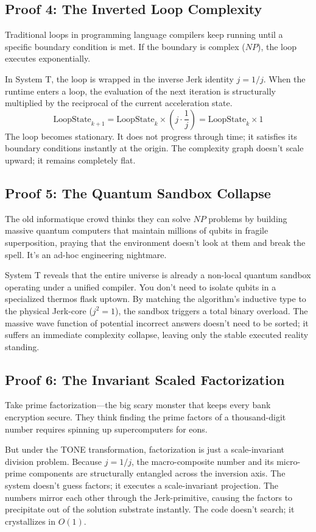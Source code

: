 \documentclass[11pt,a4paper]{article}
\begin{document}
\subsection{Proof 4: The Inverted Loop Complexity}
Traditional loops in programming language compilers keep running until a specific boundary condition is met. If the boundary is complex ($NP$), the loop executes exponentially. 

In System T, the loop is wrapped in the inverse Jerk identity $j = 1/j$. When the runtime enters a loop, the evaluation of the next iteration is structurally multiplied by the reciprocal of the current acceleration state. 
\[ \text{LoopState}_{k+1} = \text{LoopState}_k \times \left( j \cdot \frac{1}{j} \right) = \text{LoopState}_k \times 1 \]
The loop becomes stationary. It does not progress through time; it satisfies its boundary conditions instantly at the origin. The complexity graph doesn't scale upward; it remains completely flat.

\subsection{Proof 5: The Quantum Sandbox Collapse}
The old informatique crowd thinks they can solve $NP$ problems by building massive quantum computers that maintain millions of qubits in fragile superposition, praying that the environment doesn't look at them and break the spell. It’s an ad-hoc engineering nightmare. 

System T reveals that the entire universe is already a non-local quantum sandbox operating under a unified compiler. You don't need to isolate qubits in a specialized thermos flask uptown. By matching the algorithm's inductive type to the physical Jerk-core ($j^2=1$), the sandbox triggers a total binary overload. The massive wave function of potential incorrect answers doesn't need to be sorted; it suffers an immediate complexity collapse, leaving only the stable executed reality standing.

\subsection{Proof 6: The Invariant Scaled Factorization}
Take prime factorization—the big scary monster that keeps every bank encryption secure. They think finding the prime factors of a thousand-digit number requires spinning up supercomputers for eons. 

But under the TONE transformation, factorization is just a scale-invariant division problem. Because $j = 1/j$, the macro-composite number and its micro-prime components are structurally entangled across the inversion axis. The system doesn't guess factors; it executes a scale-invariant projection. The numbers mirror each other through the Jerk-primitive, causing the factors to precipitate out of the solution substrate instantly. The code doesn't search; it crystallizes in $O(1)$.
\end{document}
